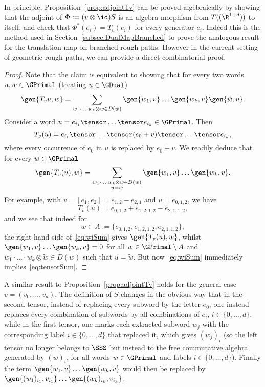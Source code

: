 \documentclass{article}
\begin{document}
In principle, Proposition~\ref{prop:adjointTv} can be proved algebraically by showing that the adjoint of $\Phi := (v \otimes \id) S$ is an algebra morphism from $T((\R^{1+d}))$ to itself, and check that $\Phi^*(e_i) = T_v(e_i)$ for every generator $e_i$. Indeed this is the method used in Section~\ref{subsec:DualMapBranched} to prove the analogous result for the translation map on branched rough paths. However in the current setting of geometric rough paths, we can provide a direct combinatorial proof.

\begin{proof}
Note that the claim is equivalent to showing that for every two words $u, w \in \GPrimal$ (treating $u \in \GDual$)
\begin{equation}\label{eq:tensorSum}
\gen{T_v u, w} = \sum_{w_1\cdot\ldots \cdot w_k \otimes \tilde w \in D(w)} \gen{w_1,v} \ldots \gen{w_k, v} \gen{\tilde w, u}.
\end{equation}
Consider a word $u =e_{i_1}\tensor \ldots \tensor e_{i_k} \in \GPrimal$. Then
\[
T_v(u) = e_{i_1} \tensor \ldots \tensor (e_0 +v) \tensor \ldots \tensor e_{i_k},
\]
where every occurrence of $e_0$ in $u$ is replaced by $e_0 + v$. We readily deduce that for every $w \in \GPrimal$
\begin{equation}\label{eq:wiSum}
\gen{T_v(u),w} = \sum_{\substack{w_1\cdot\ldots \cdot w_k \otimes \tilde w \in D(w) \\ u=\tilde w}} \gen{w_1,v} \ldots \gen{w_k, v}.
\end{equation}
For example, with $v = [e_1,e_2] = e_{1,2} - e_{2,1}$ and $u = e_{0,1,2}$, we have
\[
T_v(u) = e_{0,1,2} + e_{1,2,1,2} - e_{2,1,1,2},
\]
and we see that indeed for
\[
w \in A := \{e_{0,1,2}, e_{1,2,1,2}, e_{2,1,1,2}\},
\]
the right hand side of~\eqref{eq:wiSum} gives $\gen{T_v(u),w}$, whilst $\gen{w_1,v}\ldots\gen{w_k,v} = 0$ for all $w \in \GPrimal \setminus A$ and $w_1 \cdot \ldots \cdot w_k \otimes \tilde w \in D(w)$ such that $u= \tilde w$. But now~\eqref{eq:wiSum} immediately implies~\eqref{eq:tensorSum}.
\end{proof}

\begin{remark}\label{remark:generalGeom}
A similar result to Proposition~\ref{prop:adjointTv} holds for the general case $v = (v_0,\ldots, v_d)$. The definition of $S$ changes in the obvious way that in the second tensor, instead of replacing every subword by the letter $e_0$, one instead replaces every combination of subwords by all combinations of $e_i$, $i \in \{0,\ldots, d\}$, while in the first tensor, one marks each extracted subword $w_j$ with the corresponding label $i \in \{0, \ldots, d\}$ that replaced it, which gives $(w_j)_i$ (so the left tensor no longer belongs to $\SSS$ but instead to the free commutative algebra generated by $(w)_i$, for all words $w \in \GPrimal$ and labels $i \in \{0,\ldots, d\}$). Finally the term $\gen{w_1,v}\ldots\gen{w_k, v}$ would then be replaced by $\gen{(w_1)_{i_1}, v_{i_1}}\ldots \gen{(w_k)_{i_k}, v_{i_k}}$.
\end{remark}
\end{document}
